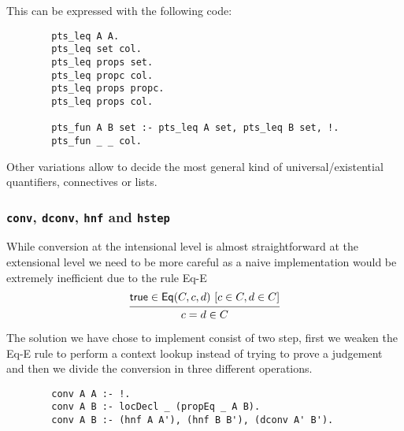 	This can be expressed with the following code:
	\begin{verbatim}
		pts_leq A A.
		pts_leq set col.
		pts_leq props set.
		pts_leq propc col.
		pts_leq props propc.
		pts_leq props col.
		
		pts_fun A B set :- pts_leq A set, pts_leq B set, !.
		pts_fun _ _ col.
	\end{verbatim}
	Other variations allow to decide the most general kind of universal/existential quantifiers, connectives or lists.
	\subsubsection{\texttt{conv}, \texttt{dconv}, \texttt{hnf} and \texttt{hstep}}
	While conversion at the intensional level is almost straightforward at the extensional level we need to be more careful as a naive implementation would be extremely inefficient due to the rule Eq-E \[\begin{prooftree}\hypo{\s{true}\in\s{Eq}(C,c,d)\ [c\in C, d\in C]}\infer1{c = d \in C}\end{prooftree}\] 
	
	The solution we have chose to implement consist of two step, first we weaken the Eq-E rule to perform a context lookup instead of trying to prove a judgement and then we divide the conversion in three different operations.
	
	\begin{verbatim}
		conv A A :- !.
		conv A B :- locDecl _ (propEq _ A B).
		conv A B :- (hnf A A'), (hnf B B'), (dconv A' B').
	\end{verbatim}
	
